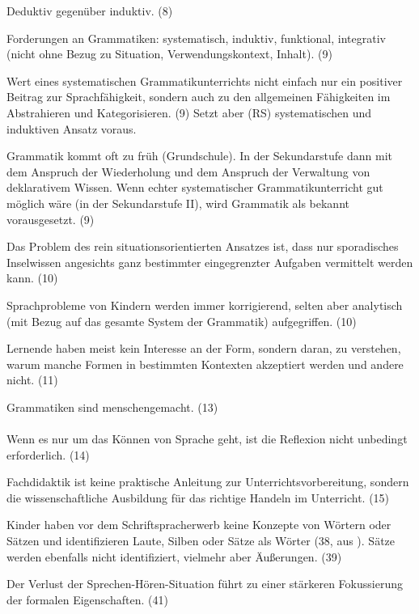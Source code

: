 Deduktiv gegenüber induktiv. (8)

Forderungen an Grammatiken: systematisch, induktiv, funktional, integrativ (nicht ohne Bezug zu Situation, Verwendungskontext, Inhalt). (9)

Wert eines systematischen Grammatikunterrichts nicht einfach nur ein positiver Beitrag zur Sprachfähigkeit, sondern auch zu den allgemeinen Fähigkeiten im Abstrahieren und Kategorisieren. (9) Setzt aber (RS) systematischen und induktiven Ansatz voraus.

Grammatik kommt oft zu früh (Grundschule).
In der Sekundarstufe dann mit dem Anspruch der Wiederholung und dem Anspruch der Verwaltung von deklarativem Wissen.
Wenn echter systematischer Grammatikunterricht gut möglich wäre (in der Sekundarstufe II), wird Grammatik als bekannt vorausgesetzt. (9)

Das Problem des rein situationsorientierten Ansatzes ist, dass nur sporadisches Inselwissen angesichts ganz bestimmter eingegrenzter Aufgaben vermittelt werden kann. (10)

Sprachprobleme von Kindern werden immer korrigierend, selten aber analytisch (mit Bezug auf das gesamte System der Grammatik) aufgegriffen. (10)

Lernende haben meist kein Interesse an der Form, sondern daran, zu verstehen, warum manche Formen in bestimmten Kontexten akzeptiert werden und andere nicht. (11)

Grammatiken sind menschengemacht. (13)



\paragraph{\citet{Bredel2013}}

Wenn es nur um das Können von Sprache geht, ist die Reflexion nicht unbedingt erforderlich. (14)

Fachdidaktik ist keine praktische Anleitung zur Unterrichtsvorbereitung, sondern die wissenschaftliche Ausbildung für das richtige Handeln im Unterricht. (15)


Kinder haben vor dem Schriftspracherwerb keine Konzepte von Wörtern oder Sätzen und identifizieren Laute, Silben oder Sätze als Wörter (38, aus \citealt{SteinigHuneke2002}).
Sätze werden ebenfalls nicht identifiziert, vielmehr aber Äußerungen. (39)


Der Verlust der Sprechen-Hören-Situation führt zu einer stärkeren Fokussierung der formalen Eigenschaften. (41)

